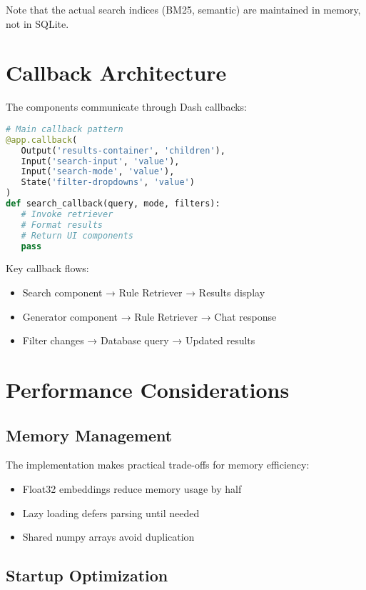 Note that the actual search indices (BM25, semantic) are maintained in memory, not in SQLite.

\section{Callback Architecture}

The components communicate through Dash callbacks:

\begin{lstlisting}[language=Python, caption={Callback structure connecting UI to RAG}, label={lst:callbacks}]
# Main callback pattern
@app.callback(
   Output('results-container', 'children'),
   Input('search-input', 'value'),
   Input('search-mode', 'value'),
   State('filter-dropdowns', 'value')
)
def search_callback(query, mode, filters):
   # Invoke retriever
   # Format results
   # Return UI components
   pass
\end{lstlisting}

Key callback flows:
\begin{itemize}[leftmargin=*,itemsep=2pt,topsep=2pt]
 \item Search component → Rule Retriever → Results display
 \item Generator component → Rule Retriever → Chat response
 \item Filter changes → Database query → Updated results
\end{itemize}

\section{Performance Considerations}

\subsection{Memory Management}

The implementation makes practical trade-offs for memory efficiency:

\begin{itemize}[leftmargin=*,itemsep=2pt,topsep=2pt]
 \item Float32 embeddings reduce memory usage by half
 \item Lazy loading defers parsing until needed
 \item Shared numpy arrays avoid duplication
\end{itemize}

\subsection{Startup Optimization}

